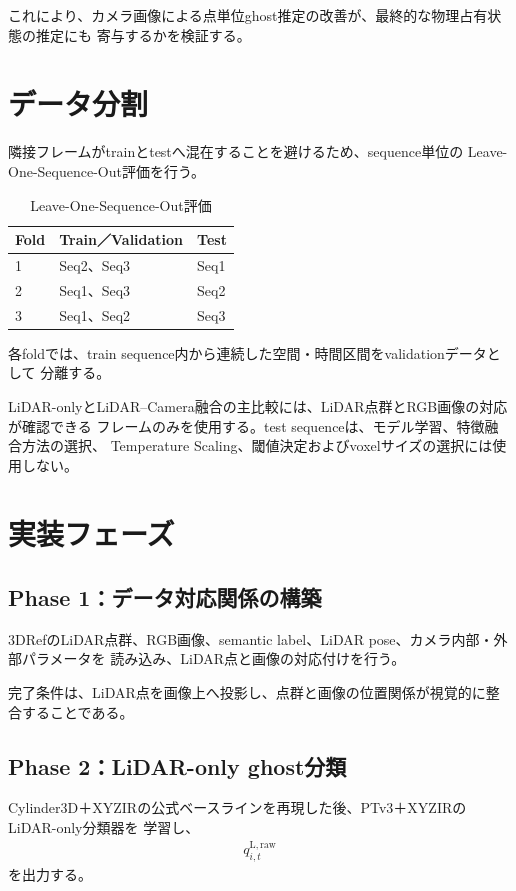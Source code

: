 \documentclass[uplatex,a4paper,11pt]{jsarticle}
\begin{document}
これにより、カメラ画像による点単位ghost推定の改善が、最終的な物理占有状態の推定にも
寄与するかを検証する。

\section{データ分割}

隣接フレームがtrainとtestへ混在することを避けるため、sequence単位の
Leave-One-Sequence-Out評価を行う。

\begin{table}[h]
  \centering
  \caption{Leave-One-Sequence-Out評価}
  \begin{tabular}{lll}
    \toprule
    Fold & Train／Validation & Test \\
    \midrule
    1 & Seq2、Seq3 & Seq1 \\
    2 & Seq1、Seq3 & Seq2 \\
    3 & Seq1、Seq2 & Seq3 \\
    \bottomrule
  \end{tabular}
\end{table}

各foldでは、train sequence内から連続した空間・時間区間をvalidationデータとして
分離する。

LiDAR-onlyとLiDAR--Camera融合の主比較には、LiDAR点群とRGB画像の対応が確認できる
フレームのみを使用する。test sequenceは、モデル学習、特徴融合方法の選択、
Temperature Scaling、閾値決定およびvoxelサイズの選択には使用しない。

\section{実装フェーズ}

\subsection{Phase 1：データ対応関係の構築}

3DRefのLiDAR点群、RGB画像、semantic label、LiDAR pose、カメラ内部・外部パラメータを
読み込み、LiDAR点と画像の対応付けを行う。

完了条件は、LiDAR点を画像上へ投影し、点群と画像の位置関係が視覚的に整合することである。

\subsection{Phase 2：LiDAR-only ghost分類}

Cylinder3D＋XYZIRの公式ベースラインを再現した後、PTv3＋XYZIRのLiDAR-only分類器を
学習し、
\begin{align}
  q_{i,t}^{\mathrm{L,raw}}
\end{align}
を出力する。
\end{document}
